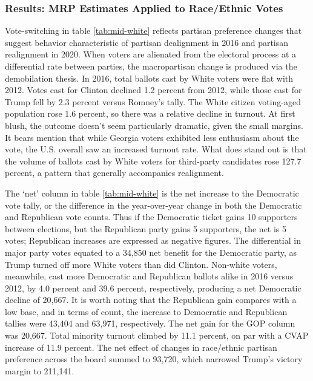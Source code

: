 \subsubsection{Results: MRP Estimates Applied to Race/Ethnic Votes}

Vote-switching in table \ref{tab:mid-white} reflects partisan preference changes that suggest behavior characteristic of partisan dealignment in 2016 and partisan realignment in 2020. When voters are alienated from the electoral process at a differential rate between parties, the macropartisan change is produced via the demobilation thesis. In 2016, total ballots cast by White voters were flat with 2012. Votes cast for Clinton declined 1.2 percent from 2012, while those cast for Trump fell by 2.3 percent versus Romney's tally. The White citizen voting-aged population rose 1.6 percent, so there was a relative decline in turnout. At first blush, the outcome doesn't seem particularly dramatic, given the small margins. It bears mention that while Georgia voters exhibited less enthusiasm about the vote, the U.S. overall saw an increased turnout rate. What does stand out is that the volume of ballots cast by White voters for third-party candidates rose 127.7 percent, a pattern that generally accompanies realignment. 

The `net' column in table \ref{tab:mid-white} is the net increase to the Democratic vote tally, or the difference in the year-over-year change in both the Democratic and Republican vote counts. Thus if the Democratic ticket gains 10 supporters between elections, but the Republican party gains 5 supporters, the net is 5 votes; Republican increases are expressed as negative figures. The differential in major party votes equated to a 34,850 net benefit for the Democratic party, as Trump turned off more White voters than did Clinton. Non-white voters, meanwhile, cast more Democratic and Republican ballots alike in 2016 versus 2012, by 4.0 percent and 39.6 percent, respectively, producing a net Democratic decline of 20,667. It is worth noting that the Republican gain compares with a low base, and in terms of count, the increase to Democratic and Republican tallies were 43,404 and 63,971, respectively. The net gain for the GOP column was 20,667. Total minority turnout climbed by 11.1 percent, on par with a CVAP increase of 11.9 percent. The net effect of changes in race/ethnic partisan preference across the board summed to 93,720, which narrowed Trump's victory margin to 211,141. 




